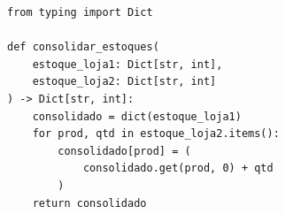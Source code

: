 \ifmostrarGabarito
\begin{verbatim}
from typing import Dict

def consolidar_estoques(
    estoque_loja1: Dict[str, int],
    estoque_loja2: Dict[str, int]
) -> Dict[str, int]:
    consolidado = dict(estoque_loja1)
    for prod, qtd in estoque_loja2.items():
        consolidado[prod] = (
            consolidado.get(prod, 0) + qtd
        )
    return consolidado
\end{verbatim}

\fi
